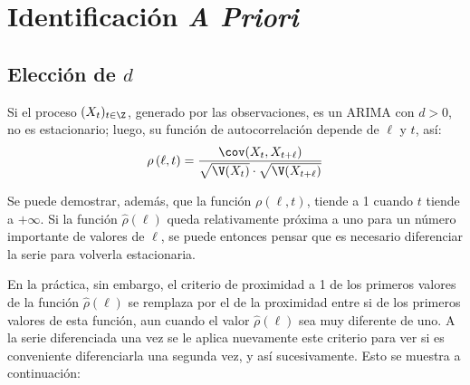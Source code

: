 \section{Identificación \emph{A Priori}  }

\subsection{Elecci\'{o}n de $d$}

Si el proceso $(X_t)_{t\in \Z}$, generado por las observaciones, es un ARIMA con $d > 0$, no es estacionario; luego, su funci\'{o}n de autocorrelaci\'{o}n depende de $\ell$ y $t$, as\'{i}:
\[
\rho \left(\ell, t \right)=\frac{\cov(X_{t}, X_{t+\ell})}{\sqrt {\V(X_{t})} \cdot \sqrt {\V(X_{t+\ell})} }
\]

Se puede demostrar, adem\'{a}s, que la funci\'{o}n $\rho (\ell, t)$, tiende a 1 cuando $t$ tiende a $+\infty $. Si la funci\'{o}n $\widehat{\rho}(\ell)$ queda relativamente pr\'{o}xima a uno para un n\'{u}mero importante de valores de $\ell$, se puede entonces pensar que es necesario diferenciar la serie para volverla estacionaria.\newline

En la pr\'{a}ctica, sin embargo, el criterio de proximidad a 1 de los primeros valores de la funci\'{o}n $\widehat{\rho }(\ell)$ se remplaza por el de la proximidad entre si de los primeros valores de esta funci\'{o}n, aun cuando el valor $\widehat{\rho }(\ell)$ sea muy diferente de uno. A la serie diferenciada una vez se le aplica nuevamente este criterio para ver si es conveniente diferenciarla una segunda vez, y as\'{i} sucesivamente. Esto se muestra a continuaci\'{o}n:


